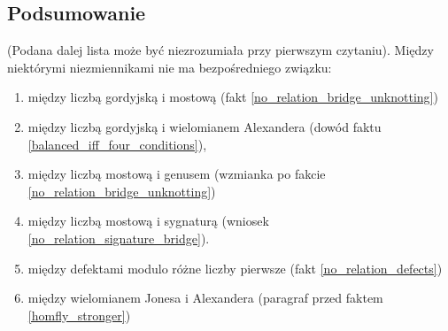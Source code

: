 \subsection{Podsumowanie}
(Podana dalej lista może być niezrozumiała przy pierwszym czytaniu).
Między niektórymi niezmiennikami nie ma bezpośredniego związku:
\begin{enumerate}
	\item między liczbą gordyjską i mostową (fakt \ref{no_relation_bridge_unknotting})
	\item między liczbą gordyjską i wielomianem Alexandera (dowód faktu \ref{balanced_iff_four_conditions}),
	\item między liczbą mostową i genusem (wzmianka po fakcie \ref{no_relation_bridge_unknotting})
	\item między liczbą mostową i sygnaturą (wniosek \ref{no_relation_signature_bridge}).
	\item między defektami modulo różne liczby pierwsze (fakt \ref{no_relation_defects})
	\item między wielomianem Jonesa i Alexandera (paragraf przed faktem \ref{homfly_stronger})
\end{enumerate}

